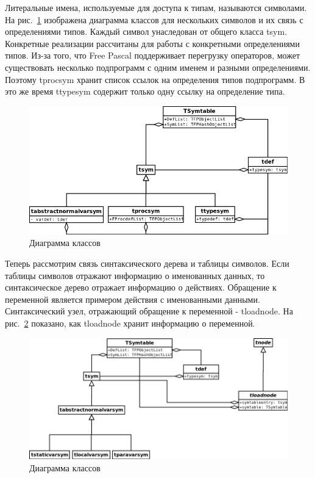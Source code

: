 \documentclass{imcs}
\begin{document}
Литеральные имена, используемые для доступа к типам, называются символами. На
рис.~\ref{sym-def-sym-inheritence} изображена диаграмма классов для нескольких символов и 
их связь с определениями типов. Каждый символ унаследован от общего класса tsym. Конкретные
реализации рассчитаны для работы с конкретными определениями типов. 
Из-за того, что Free Pascal поддерживает перегрузку операторов, может существовать несколько
подпрограмм с одним именем и разными определениями. Поэтому tprocsym хранит список ссылок на 
определения типов подпрограмм. В это же время ttypesym содержит только одну ссылку на
определение типа.

\begin{figure}[htb]
\centering
\includegraphics[width=\textwidth]{./uml/sym-def-sym-inheritence.png}
\caption{Диаграмма классов}
\label{sym-def-sym-inheritence}
\end{figure}

Теперь рассмотрим связь синтаксического дерева и таблицы символов. Если таблицы символов отражают
информацию о именованных данных, то синтаксическое дерево отражает информацию о действиях. 
Обращение к переменной является примером действия с именованными данными. Синтаксический
узел, отражающий обращение к переменной - tloadnode. На рис.~\ref{sym-node} показано, как tloadnode
хранит информацию о переменной.

\begin{figure}[htb]
\centering
\includegraphics[width=\textwidth]{./uml/sym-node.png}
\caption{Диаграмма классов}
\label{sym-node}
\end{figure}
\end{document}
